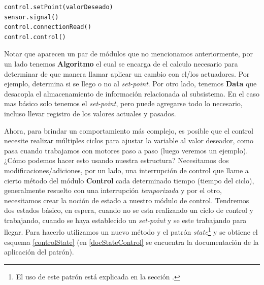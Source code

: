 \begin{lstlisting}[caption=Ejemplo de uso del subsistema.,label={usoSubsistema}]
control.setPoint(valorDeseado)
sensor.signal()
control.connectionRead()
control.control()
\end{lstlisting}

Notar que aparecen un par de módulos que no mencionamos anteriormente, por un lado tenemos \textbf{Algoritmo} el cual se encarga de el calculo necesario para determinar de que manera llamar aplicar un cambio con el/los actuadores. Por ejemplo, determina si se llego o no al \textit{set-point}. Por otro lado, tenemos \textbf{Data} que desacopla el almacenamiento de información relacionada al subsistema. En el caso mas básico solo tenemos el \textit{set-point}, pero puede agregarse todo lo necesario, incluso llevar registro de los valores actuales y pasados.

Ahora, para brindar un comportamiento más complejo, es posible que el control necesite realizar múltiples ciclos para ajustar la variable al valor deseador, como pasa cuando trabajamos con motores paso a paso (luego veremos un ejemplo). ¿Cómo podemos hacer esto usando nuestra estructura? Necesitamos dos modificaciones/adiciones, por un lado, una interrupción de control que llame a cierto método del módulo \textbf{Control} cada determinado tiempo (tiempo del ciclo), generalmente resuelto con una interrupción \textit{temporizada} y por el otro, necesitamos crear la noción de estado a nuestro módulo de control. Tendremos dos estados básico, en espera, cuando no se esta realizando un ciclo de control y trabajando, cuando se haya establecido un \textit{set-point} y se este trabajando para llegar. Para hacerlo utilizamos un nuevo método y el patrón \textit{state}\footnote{El uso de este patrón está explicada en la sección .} y se obtiene el esquema \ref{controlState} (en \ref{docStateControl} se encuentra la documentación de la aplicación del patrón).

